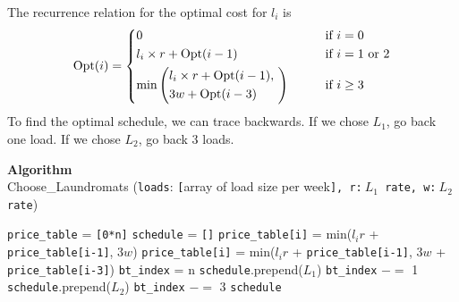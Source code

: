 \documentclass[12pt]{article}
\begin{document}
The recurrence relation for the optimal cost for $l_i$ is
$$
	\text{Opt}(i) = \left\{\begin{aligned}
		        & 0                             &                                  & \hspace*{2em}\text{if } i = 0               \\
		        & l_i\times r + \text{Opt}(i-1) &                                  & \hspace*{2em}\text{if } i = 1 \text{ or } 2 \\
		        & \text{min}
		\left(
		\begin{aligned}
				 & l_i\times r + \text{Opt}(i-1),\ \\
				 & 3w + \text{Opt}(i-3)
			\end{aligned}
		\right) &                               & \hspace*{2em}\text{if } i \geq 3                                               \\
	\end{aligned}\right.
$$
To find the optimal schedule, we can trace backwards. If we chose $L_1$, go back one load. If we chose $L_2$, go back 3 loads.
\begin{algorithm}
	\caption*{\textbf{Algorithm}\\Choose\_Laundromats \big(\texttt{loads}: \texttt{[}array of load size per week\texttt{], \texttt{r}:$\ L_1$ rate, \texttt{w}:$\ L_2$ rate}\big)}\label{alg:cap}
	\begin{algorithmic}[1]
		\State \texttt{price\_table} = \texttt{[0*n]}
		\State \texttt{schedule} = \texttt{[]}
		\State
				\State \texttt{price\_table[i]} = min($l_i r$ + \texttt{price\_table[i-1]}, $3 w$)
			\Else
				\State \texttt{price\_table[i]} = min($l_i r$ + \texttt{price\_table[i-1]}, $3 w$ + \texttt{price\_table[i-3]})
			\EndIf
		\EndFor
		\State
		\State \texttt{bt\_index} = n
				\State\texttt{schedule}.prepend($L_1$)
				\State\texttt{bt\_index} $\mathrel{-}=$ 1
			\Else
				\State\texttt{schedule}.prepend($L_2$)
				\State\texttt{bt\_index} $\mathrel{-}=$ 3
			\EndIf
		\EndWhile
		\State
		\State\Return \texttt{schedule}
	\end{algorithmic}
\end{algorithm}
\end{document}
